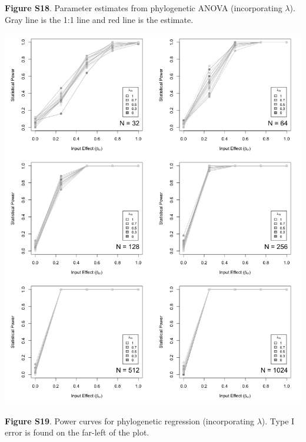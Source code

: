 \documentclass[
]{article}
\begin{document}
\textbf{Figure S18}. Parameter estimates from phylogenetic ANOVA
(incorporating \(\lambda\)). Gray line is the 1:1 line and red line is
the estimate.

\includegraphics[width=0.95\linewidth]{fig.S19}

\textbf{Figure S19}. Power curves for phylogenetic regression
(incorporating \(\lambda\)). Type I error is found on the far-left of
the plot.
\end{document}
